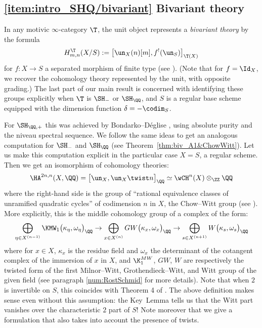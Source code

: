 \subsection*{\eqref{item:intro_SHQ/bivariant} Bivariant theory}

In any motivic $\infty$-category $\T$, the unit object represents a \emph{bivariant theory} by the formula
\[
H^\T_{m,n}(X/S) := \big[ \un_X(n)[m], f^!(\un_S) \big]_{\T(X)}
\]
for $f : X \to S$ a separated morphism of finite type (see \cite[Def.\,1.2.2]{DegliseBivariant}).
(Note that for $f=\Id_X$, we recover the cohomology theory represented by the unit, with opposite grading.)
The last part of our main result is concerned with identifying these groups explicitly when $\T$ is $\SH_{-}$ or $\SH_\QQ$, and $S$ is a regular base scheme equipped with the dimension function $\delta = -\codim_S$.

For $\SH_{\QQ,+}$ this was achieved by Bondarko--Déglise \cite[Th.\,2]{BD1}, using absolute purity and the niveau spectral sequence.
We follow the same ideas to get an analogous computation for $\SH_{-}$ and $\SH_\QQ$ (see Theorem~\ref{thm:biv_A1&ChowWitt}).
Let us make this computation explicit in the particular case $X=S$, a regular scheme.
Then we get an isomorphism of cohomology theories:
\[
\HA^{2n,n}(X,\QQ)=\big[\un_X,\un_X\twist n\big]_\QQ \simeq \wCH^n(X) \otimes_\ZZ \QQ
\]
where the right-hand side is the group of ``rational equivalence classes of unramified quadratic cycles'' of codimension $n$ in $X$, \ie the Chow--Witt group (see \cite{Fasel_wCH, FaselSrinivas}).
More explicitly, this is the middle cohomology group of a complex of the form:
\[
\bigoplus_{\eta \in X^{(n-1)}} \KMW_1\big(\kappa_\eta,\omega_\eta\big)_\QQ
\to \bigoplus_{x \in X^{(n)}} GW\big(\kappa_x,\omega_x\big)_\QQ
\to \bigoplus_{s \in X^{(n+1)}} W\big(\kappa_s,\omega_s\big)_\QQ
\]
where for $x \in X$, $\kappa_x$ is the residue field
and $\omega_x$ the determinant of the cotangent complex of the immersion of $x$ in $X$,
and $\K_1^{MW}$, $GW$, $W$ are respectively the twisted form of the
first Milnor--Witt, Grothendieck--Witt, and Witt group of the given field
(see paragraph \ref{num:RostSchmid} for more details).
Note that when $2$ is invertible on $S$, this coincides with Theorem 4 of \cite{FaselSrinivas}.
The above definition makes sense even without this assumption: the Key~Lemma tells us that the Witt part vanishes over the characteristic $2$ part of $S$!
Note moreover that we give a formulation that also takes into account the presence of twists.

